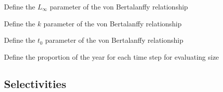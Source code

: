  {Define the $L_\infty$ parameter of the von Bertalanffy relationship}

 {Define the $k$ parameter of the von Bertalanffy relationship}

 {Define the $t_0$ parameter of the von Bertalanffy relationship}

 {Define the proportion of the year for each time step for evaluating size}

\subsubsection[Schnute]{}

\subsection{Selectivities}

